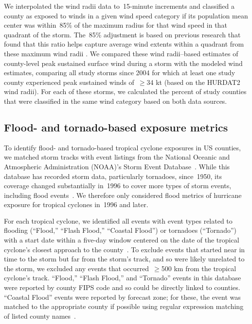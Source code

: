 We interpolated the wind radii data to~15-minute increments and
classified a county as exposed to winds in a given wind speed category if its
population mean center was within~85\% of the maximum radius for that wind
speed in that quadrant of the storm. The~85\% adjustment is based on previous
research that found that this ratio helps capture average wind extents within a
quadrant from these maximum wind radii \parencite{knaff2016using}.  We compared
these wind radii--based estimates of county-level peak sustained surface wind
during a storm with the modeled wind estimates, comparing all study storms
since 2004 for which at least one study county experienced peak sustained winds
of~$\ge$34 kt (based on the \ac{HURDAT2} wind radii). For each of these storms,
we calculated the percent of study counties that were classified in the same
wind category based on both data sources.

\subsection*{Flood- and tornado-based exposure metrics}

To identify flood- and tornado-based tropical cyclone exposures in \ac{US}
counties, we matched storm tracks with event listings from the National Oceanic
and Atmospheric Administration (NOAA)'s Storm Event
Database~\parencite{stormevents}. While this database has recorded storm data,
particularly tornadoes, since~1950, its coverage changed substantially in~1996
to cover more types of storm events, including flood
events~\parencite{stormevents}. We therefore only considered flood metrics of
hurricane exposure for tropical cyclones in~1996 and later.

For each tropical cyclone, we identified all events with event types related to
flooding (``Flood,'' ``Flash Flood,'' ``Coastal Flood'') or tornadoes
(``Tornado'') with a start date within a five-day window centered on the date
of the tropical cyclone's closest approach to the
county~\parencite{hurricaneexposuredata}. To exclude events that started near
in time to the storm but far from the storm's track, and so were likely
unrelated to the storm, we excluded any events that occurred~$\ge$500
\si{\kilo\metre} from the tropical cyclone's track. ``Flood,'' ``Flash Flood,''
and ``Tornado'' events in this database were reported by county \ac{FIPS} code
and so could be directly linked to counties.  ``Coastal Flood'' events were
reported by forecast zone; for these, the event was matched to the appropriate
county if possible using regular expression matching of listed county
names~\parencite{noaastormevents}. 

